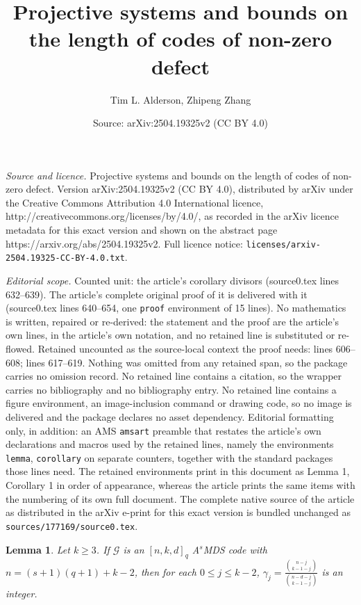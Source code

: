 \documentclass[10pt,a4paper]{amsart}
\title{Projective systems and bounds on the length of codes of non-zero defect}
\author{Tim L. Alderson, Zhipeng Zhang}
\date{Source: arXiv:2504.19325v2 (CC BY 4.0)}
\newtheorem{lemma}{Lemma}
\newcommand{\AS}{ A$^s$MDS }
\newcommand{\G}{\mathcal{G}}
\begin{document}
\maketitle

\noindent\emph{Source and licence.} Projective systems and bounds on the length of codes of non-zero defect. Version arXiv:2504.19325v2 (CC BY 4.0), distributed by arXiv under the Creative Commons Attribution 4.0 International licence, http://creativecommons.org/licenses/by/4.0/, as recorded in the arXiv licence metadata for this exact version and shown on the abstract page https://arxiv.org/abs/2504.19325v2. Full licence notice: \texttt{licenses/arxiv-2504.19325-CC-BY-4.0.txt}.\par\smallskip

\noindent\textit{Editorial scope.} Counted unit: the article's corollary divisors (source0.tex lines 632--639). The article's complete original proof of it is delivered with it (source0.tex lines 640--654, one \texttt{proof} environment of 15 lines). No mathematics is written, repaired or re-derived: the statement and the proof are the article's own lines, in the article's own notation, and no retained line is substituted or re-flowed.  Retained uncounted as the source-local context the proof needs: lines 606--608; lines 617--619.  Nothing was omitted from any retained span, so the package carries no omission record.  No retained line contains a citation, so the wrapper carries no bibliography and no bibliography entry.  No retained line contains a figure environment, an image-inclusion command or drawing code, so no image is delivered and the package declares no asset dependency.  Editorial formatting only, in addition: an AMS \texttt{amsart} preamble that restates the article's own declarations and macros used by the retained lines, namely the environments \texttt{lemma}, \texttt{corollary} on separate counters, together with the standard packages those lines need.  The retained environments print in this document as Lemma 1, Corollary 1 in order of appearance, whereas the article prints the same items with the numbering of its own full document.  The complete native source of the article as distributed in the arXiv e-print for this exact version is bundled unchanged as \texttt{sources/177169/source0.tex}.
	\begin{lemma}\label{lem: full length comb}
		Let $k\ge 3$. If $\G$ is an $[n,k,d]_q$ \AS code with $n=(s+1)(q+1)+k-2$, then for each $0\le j\le k-2$,    $\gamma_j = \frac{{n-j\choose k-1-j}}{{n-d-j \choose k-1-j}}$ is an integer.
	\end{lemma}
\end{document}
